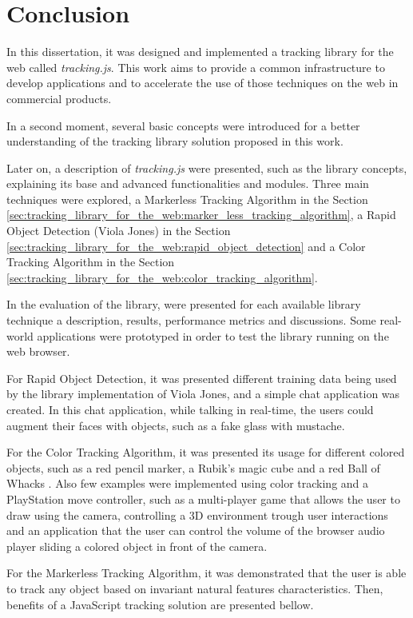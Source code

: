\chapter{Conclusion} %
\label{cha:conclusion}

In this dissertation, it was designed and implemented a tracking library for the web called \textit{tracking.js}. This work aims to provide a common infrastructure to develop applications and to accelerate the use of those techniques on the web in commercial products.

In a second moment, several basic concepts were introduced for a better understanding of the tracking library solution proposed in this work.

Later on, a description of \textit{tracking.js} were presented, such as the library concepts, explaining its base and advanced functionalities and modules. Three main techniques were explored, a Markerless Tracking Algorithm in the Section \ref{sec:tracking_library_for_the_web:marker_less_tracking_algorithm}, a Rapid Object Detection (Viola Jones) in the Section \ref{sec:tracking_library_for_the_web:rapid_object_detection} and a Color Tracking Algorithm in the Section \ref{sec:tracking_library_for_the_web:color_tracking_algorithm}.

In the evaluation of the library, were presented for each available library technique a description, results, performance metrics and discussions. Some real-world applications were prototyped in order to test the library running on the web browser.

For Rapid Object Detection, it was presented different training data being used by the library implementation of Viola Jones, and a simple chat application was created. In this chat application, while talking in real-time, the users could augment their faces with objects, such as a fake glass with mustache.

For the Color Tracking Algorithm, it was presented its usage for different colored objects, such as a red pencil marker, a Rubik’s magic cube \cite{Rubiks2013} and a red Ball of Whacks \cite{Whack2013}. Also few examples were implemented using color tracking and a PlayStation move controller, such as a multi-player game that allows the user to draw using the camera, controlling a 3D environment trough user interactions and an application that the user can control the volume of the browser audio player sliding a colored object in front of the camera.

For the Markerless Tracking Algorithm, it was demonstrated that the user is able to track any object based on invariant natural features characteristics. Then, benefits of a JavaScript tracking solution are presented bellow.

